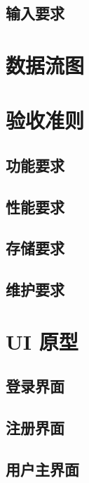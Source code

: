 \documentclass[12pt]{ctexart} %
\begin{document}
\subsection{输入要求}


\section{数据流图}

\section{验收准则}
\subsection{功能要求}

\subsection{性能要求}

\subsection{存储要求}

\subsection{维护要求}

\section{UI 原型}

\subsection{登录界面}

\subsection{注册界面}

\subsection{用户主界面}
\end{document}
